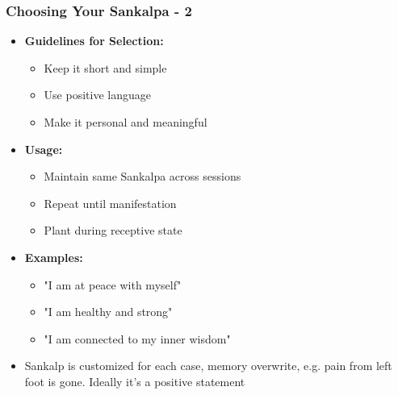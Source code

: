 \begin{frame}[fragile]\frametitle{Choosing Your Sankalpa - 2}
    \begin{itemize}
        \item \textbf{Guidelines for Selection:}
        \begin{itemize}
            \item Keep it short and simple
            \item Use positive language
            \item Make it personal and meaningful
        \end{itemize}
        \item \textbf{Usage:}
        \begin{itemize}
            \item Maintain same Sankalpa across sessions
            \item Repeat until manifestation
            \item Plant during receptive state
        \end{itemize}
        \item \textbf{Examples:}
        \begin{itemize}
            \item "I am at peace with myself"
            \item "I am healthy and strong"
            \item "I am connected to my inner wisdom"
        \end{itemize}
		\item Sankalp is customized for each case, memory overwrite, e.g. pain from left foot is gone. Ideally it's a positive statement 
    \end{itemize}
\end{frame}

